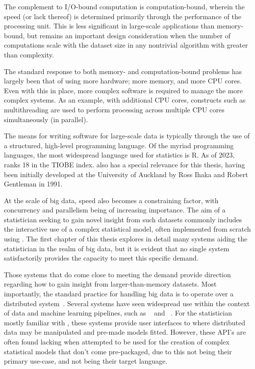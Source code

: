 The complement to I/O-bound computation is computation-bound, wherein the speed (or lack thereof) is determined primarily through the performance of the processing unit.
This is less significant in large-scale applications than memory-bound, but remains an important design consideration when the number of computations scale with the dataset size in any nontrivial algorithm with greater than  complexity.

The standard response to both memory- and computation-bound problems has largely been that of using more hardware; more memory, and more CPU cores.
Even with this in place, more complex software is required to manage the more complex systems.
As an example, with additional CPU cores, constructs such as multithreading are used to perform processing across multiple CPU cores simultaneously (in parallel).

The means for writing software for large-scale data is typically through the use of a structured, high-level programming language.
Of the myriad programming languages, the most widespread language used for statistics is R.
As of 2023, \R{} ranks {18} in the TIOBE index.
\R{} also has a special relevance for this thesis, having been
initially developed at the University of Auckland by Ross Ihaka and
Robert Gentleman in 1991\cite{ihaka1996r}.

At the scale of big data, speed also becomes a constraining factor, with concurrency and parallelism being of increasing importance.
The aim of a statistician seeking to gain novel insight from such datasets commonly includes the interactive use of a complex statistical model, often implemented from scratch using \R{}.
The first chapter of this thesis explores in detail many systems aiding the statistician in the realm of big data, but it is evident that no single system satisfactorily provides the capacity to meet this specific demand.

Those systems that do come close to meeting the demand provide direction regarding how to gain insight from larger-than-memory datasets.
Most importantly, the standard practice for handling big data is to operate over a distributed system~\cite{boja2012distributed}.
Several systems have seen widespread use within the context of data and machine learning pipelines, such as ~\cite{zaharia2016apache} and ~\cite{shvachko2010hadoop}.
For the statistician mostly familiar with \R{}, these systems provide user interfaces to \R{} where distributed data may be manipulated and pre-made models fitted.
However, these API's are often found lacking when attempted to be used for the creation of complex statistical models that don't come pre-packaged, due to this not being their primary use-case, and \R{} not being their target language.

